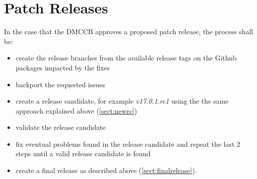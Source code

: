 \newpage

\section{Patch Releases} \label{sect:patchreleases}

In the case that the DMCCB approves a proposed patch release, the process shall be:

\begin{itemize}
\item create the release branches from the available release tags on the Github packages impacted by the fixes
\item backport the requested issues
\item create a release candidate, for example \textit{v17.0.1.rc1} using the the same approach explained above (\ref{sect:newrc})
\item validate the release candidate
\item fix eventual problems found in the release candidate and repeat the last 2 steps until a valid release candidate is found
\item create a final release as described above (\ref{sect:finalrelease}).
\end{itemize}


